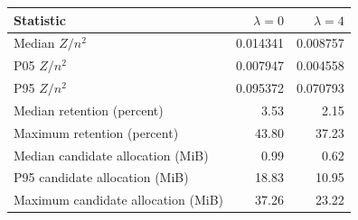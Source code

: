\begin{tabular}{lrr}
\toprule
Statistic & $\lambda=0$ & $\lambda=4$ \\
\midrule
Median $Z/n^2$ & 0.014341 & 0.008757 \\
P05 $Z/n^2$ & 0.007947 & 0.004558 \\
P95 $Z/n^2$ & 0.095372 & 0.070793 \\
Median retention (percent) & 3.53 & 2.15 \\
Maximum retention (percent) & 43.80 & 37.23 \\
Median candidate allocation (MiB) & 0.99 & 0.62 \\
P95 candidate allocation (MiB) & 18.83 & 10.95 \\
Maximum candidate allocation (MiB) & 37.26 & 23.22 \\
\bottomrule
\end{tabular}
